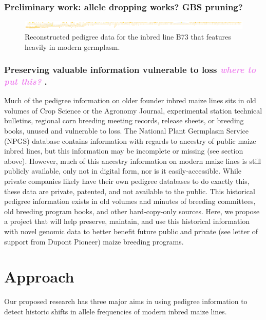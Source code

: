 \documentclass[12pt]{article}
\newcommand{\kc}[1]{\textcolor{violet}{ \emph{\scriptsize  #1}} }
\begin{document}
\subsubsection*{Preliminary work: allele dropping works? GBS pruning?}


\begin{figure}[ht]
\includegraphics[width=1.0\linewidth]{pedigree_poster.pdf}
\caption{Reconstructed pedigree data for the inbred line B73 that features heavily in modern germplasm.}
\label{fig:b73isbig}
\end{figure}

\subsubsection*{Preserving valuable information vulnerable to loss \kc{where to put this?}.}
Much of the pedigree information on older founder inbred maize lines sits in old volumes of Crop Science or the Agronomy Journal, experimental station technical bulletins, regional corn breeding meeting records, release sheets, or breeding books, unused and vulnerable to loss.  
The National Plant Germplasm Service (NPGS) database contains information with regards to ancestry of public maize inbred lines, but this information may be incomplete or missing (see section above). 
However, much of this ancestry information on modern maize lines  is still publicly available, only not in digital form, nor is it easily-accessible. 
While private companies likely have their own pedigree databases to do exactly this, these data are private, patented, and not available to the public. 
This historical pedigree information exists in old volumes and minutes of breeding committees, old breeding program books, and other hard-copy-only sources. Here, we propose a project that will help preserve, maintain, and use this historical information with novel genomic data to better benefit future public and private (see letter of support from Dupont Pioneer) maize breeding programs.

\section*{Approach}
\label{sec:approach}
Our proposed research has three major aims in using pedigree information to detect historic shifts in allele frequencies of modern inbred maize lines.
\end{document}
